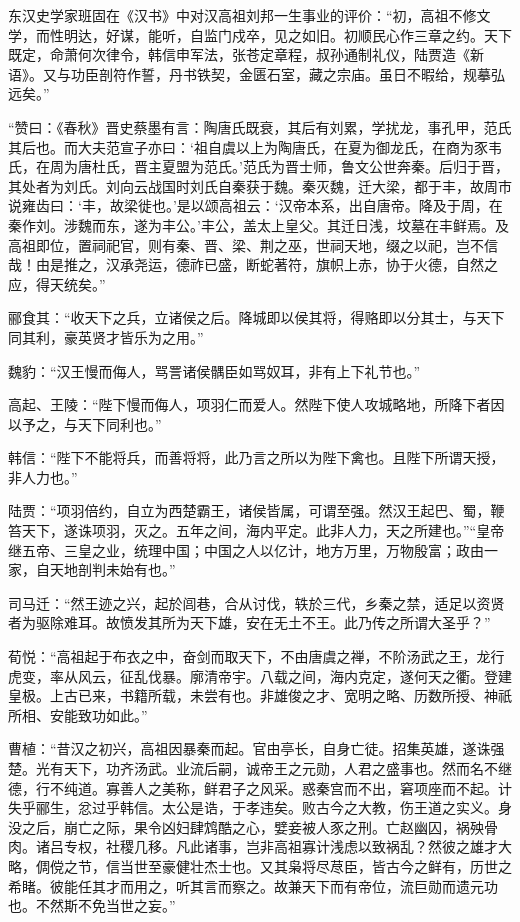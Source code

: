 东汉史学家班固在《汉书》中对汉高祖刘邦一生事业的评价：“初，高祖不修文学，而性明达，好谋，能听，自监门戍卒，见之如旧。初顺民心作三章之约。天下既定，命萧何次律令，韩信申军法，张苍定章程，叔孙通制礼仪，陆贾造《新语》。又与功臣剖符作誓，丹书铁契，金匮石室，藏之宗庙。虽日不暇给，规摹弘远矣。”

“赞曰：《春秋》晋史蔡墨有言：陶唐氏既衰，其后有刘累，学扰龙，事孔甲，范氏其后也。而大夫范宣子亦曰：‘祖自虞以上为陶唐氏，在夏为御龙氏，在商为豕韦氏，在周为唐杜氏，晋主夏盟为范氏。’范氏为晋士师，鲁文公世奔秦。后归于晋，其处者为刘氏。刘向云战国时刘氏自秦获于魏。秦灭魏，迁大梁，都于丰，故周市说雍齿曰：‘丰，故梁徙也。’是以颂高祖云：‘汉帝本系，出自唐帝。降及于周，在秦作刘。涉魏而东，遂为丰公。’丰公，盖太上皇父。其迁日浅，坟墓在丰鲜焉。及高祖即位，置祠祀官，则有秦、晋、梁、荆之巫，世祠天地，缀之以祀，岂不信哉！由是推之，汉承尧运，德祚已盛，断蛇著符，旗帜上赤，协于火德，自然之应，得天统矣。”

郦食其：“收天下之兵，立诸侯之后。降城即以侯其将，得赂即以分其士，与天下同其利，豪英贤才皆乐为之用。”

魏豹：“汉王慢而侮人，骂詈诸侯髃臣如骂奴耳，非有上下礼节也。”

高起、王陵：“陛下慢而侮人，项羽仁而爱人。然陛下使人攻城略地，所降下者因以予之，与天下同利也。”

韩信：“陛下不能将兵，而善将将，此乃言之所以为陛下禽也。且陛下所谓天授，非人力也。”

陆贾：“项羽倍约，自立为西楚霸王，诸侯皆属，可谓至强。然汉王起巴、蜀，鞭笞天下，遂诛项羽，灭之。五年之间，海内平定。此非人力，天之所建也。”“皇帝继五帝、三皇之业，统理中国；中国之人以亿计，地方万里，万物殷富；政由一家，自天地剖判未始有也。”

司马迁：“然王迹之兴，起於闾巷，合从讨伐，轶於三代，乡秦之禁，适足以资贤者为驱除难耳。故愤发其所为天下雄，安在无土不王。此乃传之所谓大圣乎？”

荀悦：“高祖起于布衣之中，奋剑而取天下，不由唐虞之禅，不阶汤武之王，龙行虎变，率从风云，征乱伐暴。廓清帝宇。八载之间，海内克定，遂何天之衢。登建皇极。上古已来，书籍所载，未尝有也。非雄俊之才、宽明之略、历数所授、神祇所相、安能致功如此。”

曹植：“昔汉之初兴，高祖因暴秦而起。官由亭长，自身亡徒。招集英雄，遂诛强楚。光有天下，功齐汤武。业流后嗣，诚帝王之元勋，人君之盛事也。然而名不继德，行不纯道。寡善人之美称，鲜君子之风采。惑秦宫而不出，窘项座而不起。计失乎郦生，忿过乎韩信。太公是诰，于孝违矣。败古今之大教，伤王道之实义。身没之后，崩亡之际，果令凶妇肆鸩酷之心，嬖妾被人豕之刑。亡赵幽囚，祸殃骨肉。诸吕专权，社稷几移。凡此诸事，岂非高祖寡计浅虑以致祸乱？然彼之雄才大略，倜傥之节，信当世至豪健壮杰士也。又其枭将尽荩臣，皆古今之鲜有，历世之希睹。彼能任其才而用之，听其言而察之。故兼天下而有帝位，流巨勋而遗元功也。不然斯不免当世之妄。”

